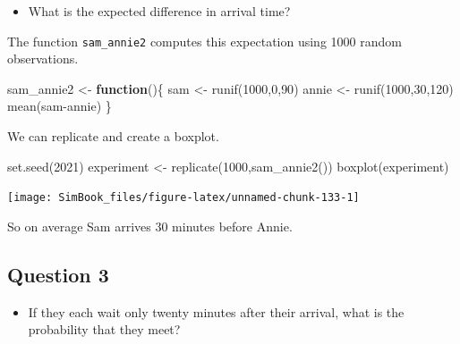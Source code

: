 \documentclass[
]{book}
\newenvironment{Shaded}{\begin{snugshade}}{\end{snugshade}}
\newcommand{\ControlFlowTok}[1]{\textcolor[rgb]{0.13,0.29,0.53}{\textbf{#1}}}
\newcommand{\DecValTok}[1]{\textcolor[rgb]{0.00,0.00,0.81}{#1}}
\newcommand{\FunctionTok}[1]{\textcolor[rgb]{0.00,0.00,0.00}{#1}}
\newcommand{\NormalTok}[1]{#1}
\newcommand{\OtherTok}[1]{\textcolor[rgb]{0.56,0.35,0.01}{#1}}
\newcommand{\SpecialCharTok}[1]{\textcolor[rgb]{0.00,0.00,0.00}{#1}}
\providecommand{\tightlist}{%
  \setlength{\itemsep}{0pt}\setlength{\parskip}{0pt}}
\begin{document}
\begin{itemize}
\tightlist
\item
  What is the expected difference in arrival time?
\end{itemize}

The function \texttt{sam\_annie2} computes this expectation using 1000 random observations.

\begin{Shaded}
\begin{Highlighting}[]
\NormalTok{sam\_annie2 }\OtherTok{\textless{}{-}} \ControlFlowTok{function}\NormalTok{()\{}
\NormalTok{  sam }\OtherTok{\textless{}{-}} \FunctionTok{runif}\NormalTok{(}\DecValTok{1000}\NormalTok{,}\DecValTok{0}\NormalTok{,}\DecValTok{90}\NormalTok{)}
\NormalTok{  annie }\OtherTok{\textless{}{-}} \FunctionTok{runif}\NormalTok{(}\DecValTok{1000}\NormalTok{,}\DecValTok{30}\NormalTok{,}\DecValTok{120}\NormalTok{)}
  \FunctionTok{mean}\NormalTok{(sam}\SpecialCharTok{{-}}\NormalTok{annie)}
\NormalTok{\}}
\end{Highlighting}
\end{Shaded}

We can replicate and create a boxplot.

\begin{Shaded}
\begin{Highlighting}[]
\FunctionTok{set.seed}\NormalTok{(}\DecValTok{2021}\NormalTok{)}
\NormalTok{experiment }\OtherTok{\textless{}{-}} \FunctionTok{replicate}\NormalTok{(}\DecValTok{1000}\NormalTok{,}\FunctionTok{sam\_annie2}\NormalTok{())}
\FunctionTok{boxplot}\NormalTok{(experiment)}
\end{Highlighting}
\end{Shaded}

\begin{center}\texttt{[image: SimBook\_files/figure-latex/unnamed-chunk-133-1]} \end{center}

So on average Sam arrives 30 minutes before Annie.

\hypertarget{question-3-1}{%
\subsection{Question 3}\label{question-3-1}}

\begin{itemize}
\tightlist
\item
  If they each wait only twenty minutes after their arrival, what is the probability that they meet?
\end{itemize}
\end{document}
